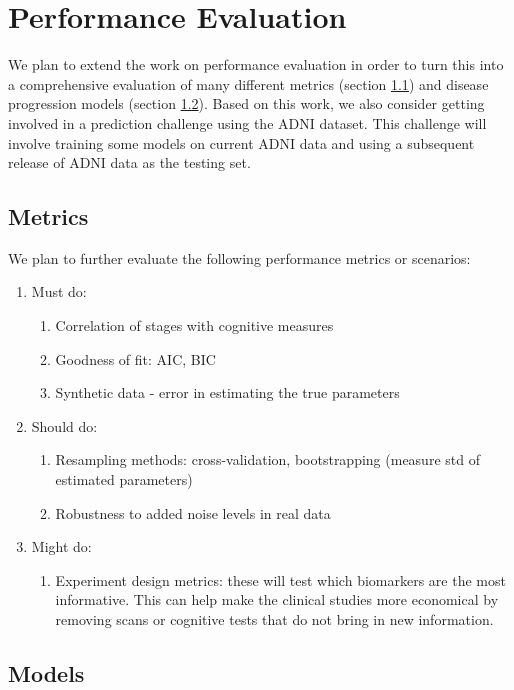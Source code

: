 \section{Performance Evaluation}
\label{sec:plan_perf_eval}

We plan to extend the work on performance evaluation in order to turn this into a comprehensive evaluation of many different metrics (section \ref{sec:plan_metrics}) and disease progression models (section \ref{sec:plan_models}). Based on this work, we also consider getting involved in a prediction challenge using the ADNI dataset. This challenge will involve training some models on current ADNI data and using a subsequent release of ADNI data as the testing set. 

\subsection{Metrics}
\label{sec:plan_metrics}

We plan to further evaluate the following performance metrics or scenarios:
\begin{enumerate}
 \item Must do:
 \begin{enumerate}
 \item Correlation of stages with cognitive measures
 \item Goodness of fit: AIC, BIC
 \item Synthetic data - error in estimating the true parameters
 \end{enumerate}
 \item Should do:
 \begin{enumerate}
 \item Resampling methods: cross-validation, bootstrapping (measure std of estimated parameters)
 \item Robustness to added noise levels in real data
 \end{enumerate}
 \item Might do:
 \begin{enumerate}
  \item Experiment design metrics: these will test which biomarkers are the most informative. This can help make the clinical studies more economical by removing scans or cognitive tests that do not bring in new information.
 \end{enumerate}
\end{enumerate}

\subsection{Models}
\label{sec:plan_models}

